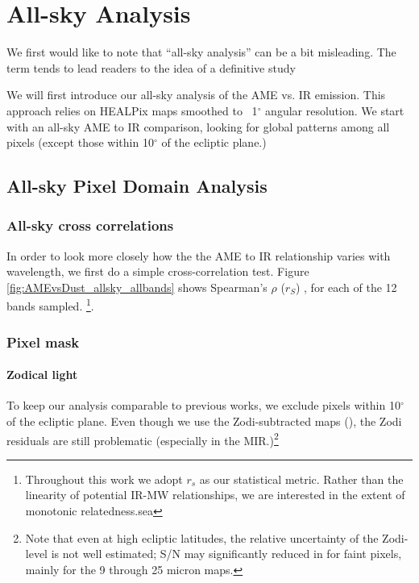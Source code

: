 \section{All-sky Analysis}
\label{sec:analysis}

    We first would like to note that ``all-sky analysis'' can be a bit misleading. The term tends to lead readers to the idea of a definitive study

    We will first introduce our all-sky analysis of the AME vs. IR emission. This approach relies on HEALPix maps smoothed to  ~1$^{\circ}$ angular resolution. We start with an all-sky AME to IR comparison, looking for global patterns among all pixels (except those within 10$^{\circ}$ of the ecliptic plane.)

\subsection{All-sky Pixel Domain Analysis}
  \subsubsection{All-sky cross correlations}
  	In order to look more closely how the the AME to IR relationship varies with wavelength, we first do a simple cross-correlation test. Figure \ref{fig:AMEvsDust_allsky_allbands} shows Spearman's $\rho$ ($r_{S}$)
    , for each of the 12 bands sampled. \footnote{Throughout this work we adopt $r_{s}$ as our statistical metric. Rather than the linearity of potential IR-MW relationships, we are interested in the extent of monotonic relatedness.sea }.

    \subsubsection{Pixel mask}
      \paragraph{Zodical light}
        To keep our analysis comparable to previous works, we exclude pixels within 10$^{\circ}$ of the ecliptic plane. Even though we use the Zodi-subtracted maps (\citep{kelsall98, kondo16}), the Zodi residuals are still problematic (especially in the MIR.)\footnote{Note that even at high ecliptic latitudes, the relative uncertainty of the Zodi-level is not well estimated; S/N may significantly reduced in for faint pixels, mainly for the 9 through 25 micron maps.}

